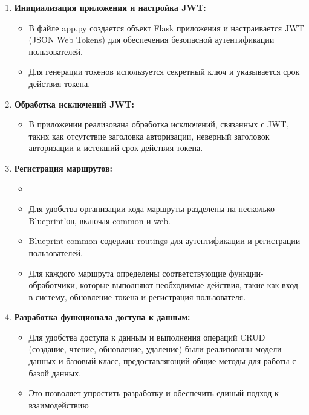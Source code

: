\documentclass[12pt, russian]{extarticle}
\begin{document}
\begin{spacing}{1.5}
    \begin{enumerate}
        \item \textbf{Инициализация приложения и настройка JWT:}
            \begin{itemize}
                \item В файле app.py создается объект Flask приложения и настраивается JWT (JSON Web Tokens)
                    для обеспечения безопасной аутентификации пользователей.
                \item Для генерации токенов используется секретный ключ и указывается срок действия токена.
            \end{itemize}
        \item \textbf{Обработка исключений JWT:}
            \begin{itemize}
                \item В приложении реализована обработка исключений, связанных с JWT,
                    таких как отсутствие заголовка авторизации, неверный заголовок
                    авторизации и истекший срок действия токена.
            \end{itemize}
        \item \textbf{Регистрация маршрутов:}
        \begin{itemize}
                \item {}
                \item Для удобства организации кода маршруты разделены на несколько Blueprint'ов, включая common и web.
                \item Blueprint common содержит routings для аутентификации и регистрации пользователей.
                \item Для каждого маршрута определены соответствующие функции-обработчики, которые выполняют
                    необходимые действия, такие как вход в систему, обновление токена и регистрация пользователя.
            \end{itemize}
        \item \textbf{Разработка функционала доступа к данным:}
            \begin{itemize}
                \item Для удобства доступа к данным и выполнения операций CRUD (создание, чтение, обновление, удаление)
                    были реализованы модели данных и базовый класс, предоставляющий общие методы для работы с базой данных.
                \item Это позволяет упростить разработку и обеспечить единый подход к взаимодействию

\end{itemize}
\end{enumerate}
\end{spacing}
\end{document}
